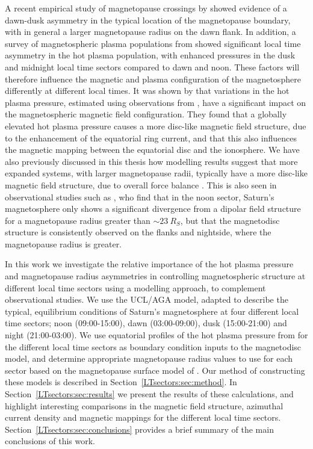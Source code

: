 A recent empirical study of magnetopause crossings by \citet{pilkington2015b} showed evidence of a dawn-dusk asymmetry in the typical location of the magnetopause boundary, with in general a larger magnetopause radius on the dawn flank. In addition, a survey of magnetospheric plasma populations from \citet{sergis2017} showed significant local time asymmetry in the hot plasma population, with enhanced pressures in the dusk and midnight local time sectors compared to dawn and noon. These factors will therefore influence the magnetic and plasma configuration of the magnetosphere differently at different local times.  It was shown by \citet{achilleos2010b} that variations in the hot plasma pressure, estimated using observations from \citet{sergis2007}, have a significant impact on the magnetospheric magnetic field configuration. They found that a globally elevated hot plasma pressure causes a more disc-like magnetic field structure, due to the enhancement of the equatorial ring current, and that this also influences the magnetic mapping between the equatorial disc and the ionosphere. We have also previously discussed in this thesis how modelling results suggest that more expanded systems, with larger magnetopause radii, typically have a more disc-like magnetic field structure, due to overall force balance \citep[e.g.][]{bunce2008, achilleos2010a,sorba2017}. This is also seen in observational studies such as \citet{arridge2008}, who find that in the noon sector, Saturn's magnetosphere only shows a significant divergence from a dipolar field structure for a magnetopause radius greater than ${\sim}\SI{23}{R_S}$, but that the magnetodisc structure is consistently observed on the flanks and nightside, where the magnetopause radius is greater.

In this work we investigate the relative importance of the hot plasma pressure and magnetopause radius asymmetries in controlling magnetospheric structure at different local time sectors using a modelling approach, to complement observational studies. We use the UCL/AGA model, adapted to describe the typical, equilibrium conditions of Saturn's magnetosphere at four different local time sectors; noon (09:00-15:00), dawn (03:00-09:00), dusk (15:00-21:00) and night (21:00-03:00). We use equatorial profiles of the hot plasma pressure from \citet{sergis2017} for the different local time sectors as boundary condition inputs to the magnetodisc model, and determine appropriate magnetopause radius values to use for each sector based on the magnetopause surface model of \citet{pilkington2015b}. Our method of constructing these models is described in Section~\ref{LTsectors:sec:method}. In Section~\ref{LTsectors:sec:results} we present the results of these calculations, and highlight interesting comparisons in the magnetic field structure, azimuthal current density and magnetic mappings for the different local time sectors. Section~\ref{LTsectors:sec:conclusions} provides a brief summary of the main conclusions of this work.

